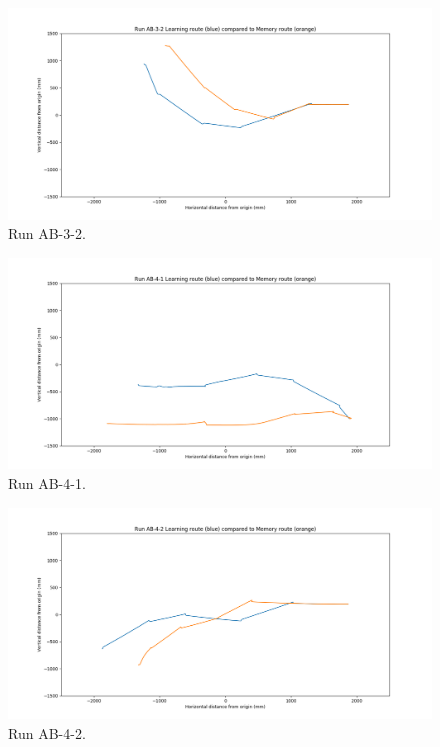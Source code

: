 \documentclass[a4paper,12pt,twoside,openright]{article}
\begin{document}
\begin{figure}[h!]
 \centering
  \includegraphics[width=\textwidth]{AB-3-2}
  \caption{
    \label{fig:ab-3-2} Run AB-3-2.
  }
\end{figure}

\begin{figure}[h!]
 \centering
  \includegraphics[width=\textwidth]{AB-4-1}
  \caption{
    \label{fig:ab-4-1} Run AB-4-1.
  }
\end{figure}

\begin{figure}[h!]
 \centering
  \includegraphics[width=\textwidth]{AB-4-2}
  \caption{
    \label{fig:ab-4-2} Run AB-4-2.
  }
\end{figure}
\FloatBarrier
\newpage
\end{document}
